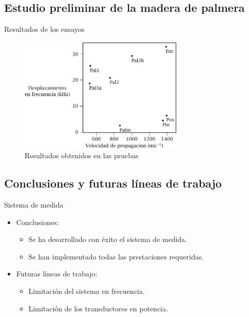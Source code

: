 \documentclass[utf8, compress]			{beamer}
\begin{document}
\subsection{Estudio preliminar de la madera de palmera}

\begin{frame}{Resultados de los ensayos}
    \begin{figure}
	\includegraphics[height=55mm, keepaspectratio]{resultados.pdf}
	\caption{Resultados obtenidos en las pruebas}
	\label{fig:results}
    \end{figure}
\end{frame}


\subsection{Conclusiones y futuras líneas de trabajo}

\begin{frame}{Sistema de medida}
    \begin{itemize}
	\item Conclusiones:
	    \begin{itemize}
		\item Se ha desarrollado con éxito el sistema de medida.
		\item Se han implementado todas las prestaciones
		    requeridas.
	    \end{itemize}
	    \vspace{1ex}
	\item Futuras líneas de trabajo:
	    \begin{itemize}
		\item Limitación del sistema en frecuencia.
		\item Limitación de los transductores en potencia.
	    \end{itemize}
    \end{itemize}
\end{frame}
\end{document}
